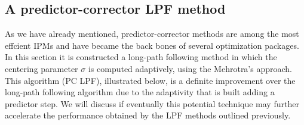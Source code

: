 \documentclass[a4paper,10 pt,titlepage,twoside]{book}
\theoremstyle{plain}
\theoremstyle{definition}
\theoremstyle{remark}
\begin{document}
{{\subsection{A predictor-corrector LPF method}
As we have already mentioned, predictor-corrector methods are among the most effcient IPMs and have became the back bones of several optimization packages.\\
In this section it is constructed a long-path following method in which the centering parameter $\sigma$ is computed adaptively, using the Mehrotra's approach.\\
This algorithm  (PC LPF), illustrated below, is a definite improvement over the long-path following algorithm due to the adaptivity that is built adding a predictor step. We will discuss if eventually this potential
technique may further accelerate the performance obtained by the LPF methods outlined previously.\\

}}
\end{document}
